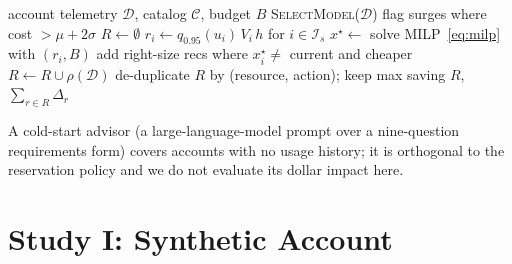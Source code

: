 \documentclass[10pt,journal]{IEEEtran}
\begin{document}
\begin{algorithm}[t]
\caption{Reservation-policy realization for one account}
\label{alg:pipe}
\begin{algorithmic}[1]
\Require account telemetry $\mathcal{D}$, catalog $\mathcal{C}$, budget $B$
\State \textsc{SelectModel}($\mathcal{D}$) 
\State flag surges where cost $>\mu+2\sigma$ 
\State $R \gets \emptyset$
  \State $r_i \gets q_{0.95}(u_i)\,V_i\,h$ for $i\in\mathcal{I}_s$ 
  \State $x^\star \gets$ solve MILP~\eqref{eq:milp} with $(r_i,B)$
  \State add right-size recs where $x^\star_i\neq$ current and cheaper
\EndFor
{}
  \State $R \gets R \cup \rho(\mathcal{D})$ 
\EndFor
\State de-duplicate $R$ by (resource, action); keep max saving
\State \Return $R$, $\sum_{r\in R}\Delta_r$
\end{algorithmic}
\end{algorithm}

A cold-start advisor (a large-language-model prompt over a nine-question
requirements form) covers accounts with no usage history; it is orthogonal
to the reservation policy and we do not evaluate its dollar impact here.

\section{Study I: Synthetic Account}\label{sec:eval}
\end{document}
